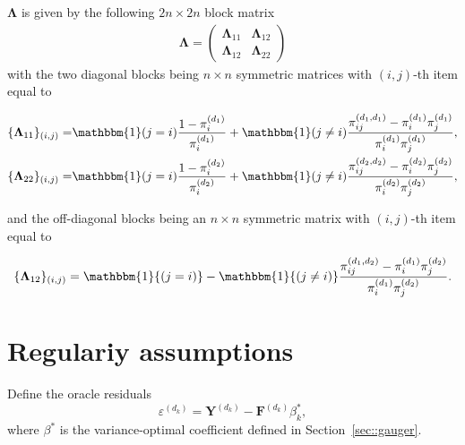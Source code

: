 \documentclass{article}
\theoremstyle{plain}
\theoremstyle{definition}
\theoremstyle{remark}
\newcommand{\bY}{\boldsymbol{Y}}
\newcommand{\bF}{\boldsymbol{F}}
\newcommand{\bLambda}{\boldsymbol{\Lambda}}
\newcommand{\indicator}{\mathbbm{1}}
\begin{document}
$\bLambda$ is given by the following $2n\times 2n$ block matrix
\begin{align}\label{eq::bLambda}
    \bLambda =
    \begin{pmatrix}
        \bLambda_{11} & \bLambda_{12} \\
        \bLambda_{12} & \bLambda_{22}
    \end{pmatrix}
\end{align}
with the two diagonal blocks being $n\times n$ symmetric matrices with $(i,j)$-th item equal to

\begin{align*}
    \{\bLambda_{11}\}_{(i,j)} =& \indicator(j=i) \frac{1-\pi_i^{(d_1)}}{\pi_i^{(d_1)}} 
    + \indicator(j\neq i)\frac{\pi_{ij}^{(d_1,d_1)}-\pi_i^{(d_1)}\pi_j^{(d_1)}}{\pi_i^{(d_1)}\pi_j^{(d_1)}}, \\
    \{\bLambda_{22}\}_{(i,j)} =& \indicator(j=i) \frac{1-\pi_i^{(d_2)}}{\pi_i^{(d_2)}} 
    + \indicator(j\neq i)\frac{\pi_{ij}^{(d_2,d_2)}-\pi_i^{(d_2)}\pi_j^{(d_2)}}{\pi_i^{(d_2)}\pi_j^{(d_2)}},
\end{align*}

and the off-diagonal blocks being an $n\times n$ symmetric matrix with $(i,j)$-th item equal to

$$
    \{\bLambda_{12}\}_{(i,j)} =\indicator{(j=i)} 
    - \indicator{(j\neq i)}\frac{\pi_{ij}^{(d_1,d_2)}-\pi_i^{(d_1)}\pi_j^{(d_2)}}{\pi_i^{(d_1)}\pi_j^{(d_2)}}.
$$
\section{Regulariy assumptions}\label{sec:regularity-condition}
 Define the oracle residuals
\[
\varepsilon^{(d_k)} = \bY^{(d_k)} - \bF^{(d_k)} \beta_k^*,
\]
where $\beta^*$ is the variance-optimal coefficient defined in Section~\ref{sec::gauger}.
\end{document}
